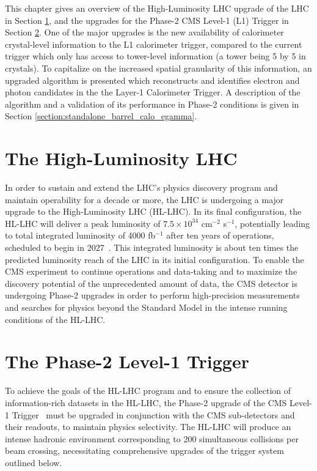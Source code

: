 This chapter gives an overview of the High-Luminosity LHC upgrade of the LHC in Section \ref{section:hl-lhc}, and the upgrades for the Phase-2 CMS Level-1 (L1) Trigger in Section \ref{section:phase-2-l1t}. One of the major upgrades is the new availability of calorimeter crystal-level information to the L1 calorimeter trigger, compared to the current trigger which only has access to tower-level information (a tower being 5 by 5 in crystals). To capitalize on the increased spatial granularity of this information, an upgraded algorithm is presented which reconstructs and identifies electron and photon candidates in the the Layer-1 Calorimeter Trigger. A description of the algorithm and a validation of its performance in Phase-2 conditions is given in Section \ref{section:standalone_barrel_calo_egamma}.

\section{The High-Luminosity LHC}
\label{section:hl-lhc}
In order to sustain and extend the LHC's physics discovery program and maintain operability for a decade or more, the LHC is undergoing a major upgrade to the High-Luminosity LHC (HL-LHC). In its final configuration, the HL-LHC will deliver a peak luminosity of $7.5 \times 10^{34}$ cm$^{-2}$ s$^{-1}$, potentially leading to total integrated luminosity of 4000 fb$^{-1}$ after ten years of operations, scheduled to begin in 2027~\cite{CMS-TDR-021}. This integrated luminosity is about ten times the predicted luminosity reach of the LHC in its initial configuration. To enable the CMS experiment to continue operations and data-taking and to maximize the discovery potential of the unprecedented amount of data, the CMS detector is undergoing Phase-2 upgrades in order to perform high-precision measurements and searches for physics beyond the Standard Model in the intense running conditions of the HL-LHC. 

\section{The Phase-2 Level-1 Trigger}
\label{section:phase-2-l1t}
To achieve the goals of the HL-LHC program and to ensure the collection of information-rich datasets in the HL-LHC, the Phase-2 upgrade of the CMS Level-1 Trigger~\cite{CMS-TDR-021} must be upgraded in conjunction with the CMS sub-detectors and their readouts, to maintain physics selectivity. The HL-LHC will produce an intense hadronic environment corresponding to 200 simultaneous collisions per beam crossing, necessitating comprehensive upgrades of the trigger system outlined below.

